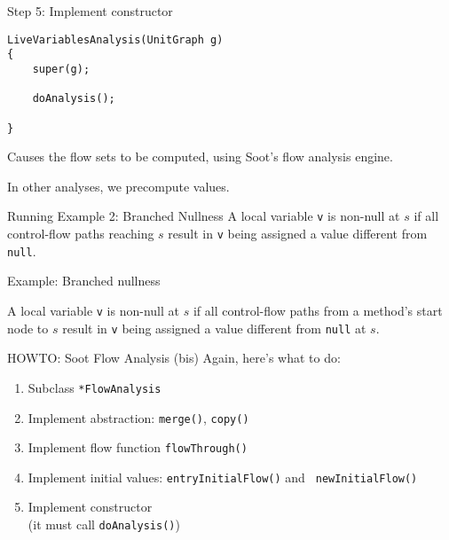 \begin{slide}{Step 5: Implement constructor}
\begin{verbatim}
LiveVariablesAnalysis(UnitGraph g)
{
    super(g);

    doAnalysis();
    
}
\end{verbatim}
Causes the flow sets to be computed, using Soot's flow
analysis engine.

\quad

In other analyses, we precompute values.
\end{slide}


\begin{slide}{Running Example 2: Branched Nullness}
\vspace*{-0.2in} 
A local variable {\tt v} is {\red non-null} at $s$ if all
control-flow paths reaching $s$ result in {\tt v} being
assigned a value different from {\tt null}.

\begin{center}

\end{center}
\end{slide}

\begin{slide}{Example: Branched nullness}

A local variable {\tt v} is {\red non-null} at $s$ if all control-flow
paths from a method's start node to $s$ result in {\tt v} being
assigned a value different from {\tt null} at $s$.

\begin{center}

\end{center}

\end{slide}

\begin{slide}{HOWTO: Soot Flow Analysis (bis)}
Again, here's what to do:
\begin{enumerate}
\item Subclass \verb+*FlowAnalysis+
\item Implement abstraction: {\tt merge()}, {\tt copy()}
\item Implement flow function {\tt flowThrough()}
\item Implement initial values: {\tt entryInitialFlow()} and {\tt
newInitialFlow()}
\item Implement constructor \\ \quad (it must call {\tt doAnalysis()})
\end{enumerate}
\end{slide}

